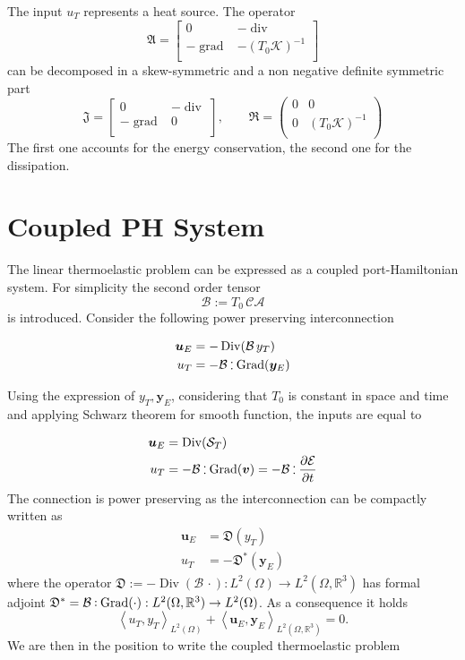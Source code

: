 \documentclass[11t]{article}
\DeclareMathOperator*{\grad}{grad}
\DeclareMathOperator*{\Grad}{Grad}
\DeclareMathOperator*{\Div}{Div}
\renewcommand{\div}{\operatorname{div}}
\def\onedot{$\mathsurround0pt\ldotp$}
\def\cddot{%
	\mathbin{\vcenter{\baselineskip.67ex
			\hbox{\onedot}\hbox{\onedot}}%
}}
\begin{document}
The input $u_T$ represents a heat source. The operator 
\[
\mathfrak{A} = \begin{bmatrix}
0 & -\div \\
-\grad & - (T_0 \mathcal{K})^{-1} \\
\end{bmatrix}
\]
can be decomposed in a skew-symmetric and a non negative definite symmetric part
\[
\mathfrak{J} = \begin{bmatrix}
0 & -\div \\
-\grad & 0 \\
\end{bmatrix}, \qquad
\mathfrak{R} = \begin{pmatrix}
0 & 0 \\
0 & (T_0 \mathcal{K})^{-1} \\
\end{pmatrix}
\]
The first one accounts for the energy conservation, the second one for the dissipation.

\section{Coupled PH System}
The linear thermoelastic problem can be expressed as a coupled port-Hamiltonian system. For simplicity the second order tensor 
\[\mathcal{B}:=T_0 \, \mathcal{C} \mathcal{A}\]
 is introduced.
 Consider the following power preserving interconnection

\begin{align}
\bm{u}_E &= - \Div(\mathcal{B} \, y_T) \\
u_T &= - \mathcal{B} \cddot\Grad(\bm{y}_E) 
\end{align}

Using the expression of $y_T, \bm{y}_E$, considering that $T_0$ is constant in space and time and applying Schwarz theorem for smooth function, the inputs are equal to

\begin{align*}
\bm{u}_E &=  \Div(\mathcal{S}_T) \\
u_T &= - \mathcal{B} \cddot  \Grad(\bm{v}) = - \mathcal{B} \cddot  \diffp{\mathcal{E}}{t} 
\end{align*}
The connection is power preserving as the interconnection can be compactly written as 
\begin{align}
\bm{u}_E &= \mathfrak{D}(y_T) \\
u_T &= - \mathfrak{D}^*(\bm{y}_E) 
\end{align}
where the operator $\mathfrak{D} := - \Div(\mathcal{B} \, \cdot) : L^2(\Omega) \rightarrow L^2(\Omega, \mathbb{R}^3)$ has formal adjoint $ \mathfrak{D}^* =  \mathcal{B} \cddot  \Grad(\cdot): L^2(\Omega, \mathbb{R}^3) \rightarrow L^2(\Omega)$. As a consequence it holds
\[
\left\langle u_T, y_T \right\rangle_{L^2(\Omega)} + \left\langle \bm{u}_E, \bm{y}_E \right\rangle_{L^2(\Omega, \mathbb{R}^3)} = 0.
\]
 We are then in the position to write the coupled thermoelastic problem 
\end{document}
